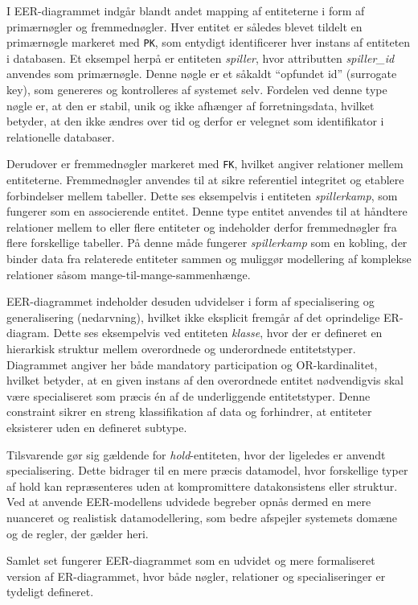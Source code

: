 I EER-diagrammet indgår blandt andet mapping af entiteterne i form af primærnøgler og fremmednøgler. Hver entitet er således blevet tildelt en primærnøgle markeret med \texttt{PK}, som entydigt identificerer hver instans af entiteten i databasen. Et eksempel herpå er entiteten \textit{spiller}, hvor attributten \textit{spiller\_id} anvendes som primærnøgle. Denne nøgle er et såkaldt ``opfundet id'' (surrogate key), som genereres og kontrolleres af systemet selv. Fordelen ved denne type nøgle er, at den er stabil, unik og ikke afhænger af forretningsdata, hvilket betyder, at den ikke ændres over tid og derfor er velegnet som identifikator i relationelle databaser.

Derudover er fremmednøgler markeret med \texttt{FK}, hvilket angiver relationer mellem entiteterne. Fremmednøgler anvendes til at sikre referentiel integritet og etablere forbindelser mellem tabeller. Dette ses eksempelvis i entiteten \textit{spillerkamp}, som fungerer som en associerende entitet. Denne type entitet anvendes til at håndtere relationer mellem to eller flere entiteter og indeholder derfor fremmednøgler fra flere forskellige tabeller. På denne måde fungerer \textit{spillerkamp} som en kobling, der binder data fra relaterede entiteter sammen og muliggør modellering af komplekse relationer såsom mange-til-mange-sammenhænge.

EER-diagrammet indeholder desuden udvidelser i form af specialisering og generalisering (nedarvning), hvilket ikke eksplicit fremgår af det oprindelige ER-diagram. Dette ses eksempelvis ved entiteten \textit{klasse}, hvor der er defineret en hierarkisk struktur mellem overordnede og underordnede entitetstyper. Diagrammet angiver her både mandatory participation og OR-kardinalitet, hvilket betyder, at en given instans af den overordnede entitet nødvendigvis skal være specialiseret som præcis én af de underliggende entitetstyper. Denne constraint sikrer en streng klassifikation af data og forhindrer, at entiteter eksisterer uden en defineret subtype.

Tilsvarende gør sig gældende for \textit{hold}-entiteten, hvor der ligeledes er anvendt specialisering. Dette bidrager til en mere præcis datamodel, hvor forskellige typer af hold kan repræsenteres uden at kompromittere datakonsistens eller struktur. Ved at anvende EER-modellens udvidede begreber opnås dermed en mere nuanceret og realistisk datamodellering, som bedre afspejler systemets domæne og de regler, der gælder heri.

Samlet set fungerer EER-diagrammet som en udvidet og mere formaliseret version af ER-diagrammet, hvor både nøgler, relationer og specialiseringer er tydeligt defineret.

